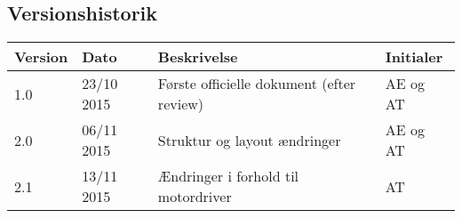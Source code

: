 \subsection{Versionshistorik}

\begin{center}
		\begin{longtable}{ | m{1.5cm} | m{2cm}| m{7.5cm}| m{2cm}| } 
			\hline
			\textbf{Version} & \textbf{Dato} &  \textbf{Beskrivelse} & \textbf{Initialer}  \\ 
			\hline
			1.0  & 23/10 2015 & Første officielle dokument (efter review) & AE og AT \\
			\hline
			2.0  & 06/11 2015 & Struktur og layout ændringer & AE og AT \\
					\hline
			2.1  & 13/11 2015 & Ændringer i forhold til motordriver & AT \\
			\hline
		\end{longtable}	
	\end{center}